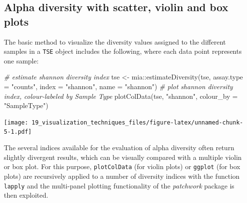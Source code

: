 \documentclass[
]{book}
\newenvironment{Shaded}{\begin{snugshade}}{\end{snugshade}}
\newcommand{\AttributeTok}[1]{\textcolor[rgb]{0.77,0.63,0.00}{#1}}
\newcommand{\CommentTok}[1]{\textcolor[rgb]{0.56,0.35,0.01}{\textit{#1}}}
\newcommand{\FunctionTok}[1]{\textcolor[rgb]{0.00,0.00,0.00}{#1}}
\newcommand{\NormalTok}[1]{#1}
\newcommand{\OtherTok}[1]{\textcolor[rgb]{0.56,0.35,0.01}{#1}}
\newcommand{\SpecialCharTok}[1]{\textcolor[rgb]{0.00,0.00,0.00}{#1}}
\newcommand{\StringTok}[1]{\textcolor[rgb]{0.31,0.60,0.02}{#1}}
\begin{document}
\hypertarget{alpha-diversity-with-scatter-violin-and-box-plots}{%
\subsection{Alpha diversity with scatter, violin and box plots}\label{alpha-diversity-with-scatter-violin-and-box-plots}}

The basic method to visualize the diversity values assigned to the
different samples in a \texttt{TSE} object includes the following, where each
data point represents one sample:

\begin{Shaded}
\begin{Highlighting}[]
\CommentTok{\# estimate shannon diversity index}
\NormalTok{tse }\OtherTok{\textless{}{-}}\NormalTok{ mia}\SpecialCharTok{::}\FunctionTok{estimateDiversity}\NormalTok{(tse, }
                              \AttributeTok{assay.type =} \StringTok{"counts"}\NormalTok{,}
                              \AttributeTok{index =} \StringTok{"shannon"}\NormalTok{, }
                              \AttributeTok{name =} \StringTok{"shannon"}\NormalTok{)}
\CommentTok{\# plot shannon diversity index, colour{-}labeled by Sample Type}
\FunctionTok{plotColData}\NormalTok{(tse, }\StringTok{"shannon"}\NormalTok{, }\AttributeTok{colour\_by =} \StringTok{"SampleType"}\NormalTok{)}
\end{Highlighting}
\end{Shaded}

\texttt{[image: 19\_visualization\_techniques\_files/figure-latex/unnamed-chunk-5-1.pdf]}

The several indices available for the evaluation of alpha diversity
often return slightly divergent results, which can be visually
compared with a multiple violin or box plot. For this purpose,
\texttt{plotColData} (for violin plots) or \texttt{ggplot} (for box plots) are
recursively applied to a number of diversity indices with the function
\texttt{lapply} and the multi-panel plotting functionality of the \emph{patchwork}
package is then exploited.
\end{document}
